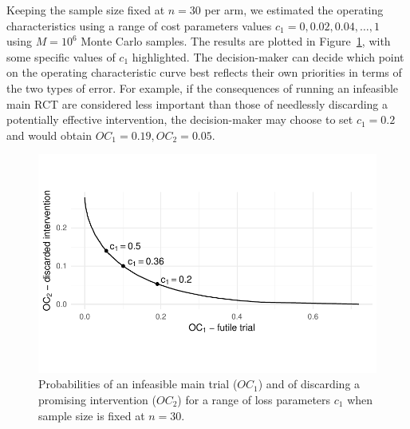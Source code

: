 \documentclass[AMA,STIX1COL]{WileyNJD-v2}
\begin{document}
Keeping the sample size fixed at $n = 30$ per arm, we estimated the operating characteristics using a range of cost parameters values $c_1 = 0, 0.02, 0.04, \ldots , 1$ using $M = 10^6$ Monte Carlo samples. The results are plotted in Figure~\ref{fig:tiga_n60}, with some specific values of $c_1$ highlighted. The decision-maker can decide which point on the operating characteristic curve best reflects their own priorities in terms of the two types of error. For example, if the consequences of running an infeasible main RCT are considered less important than those of needlessly discarding a potentially effective intervention, the decision-maker may choose to set $c_1 = 0.2$ and would obtain $OC_1 = 0.19, OC_2 = 0.05$.

\begin{figure}
\centering
\includegraphics[scale=0.8]{./figures/tiga_n30}
\caption{Probabilities of an infeasible main trial ($OC_1$) and of discarding a promising intervention ($OC_2$) for a range of loss parameters $c_1$ when sample size is fixed at $n=30$.}
\label{fig:tiga_n60}
\end{figure}

%
\end{document}
